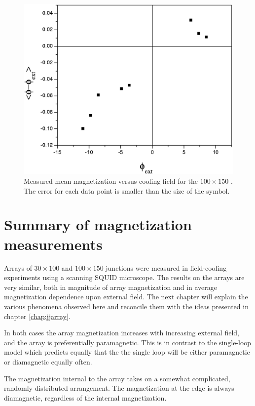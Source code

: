 \begin{figure}[p]
\includegraphics[width=5.7in]{figs/pme_exp/fig3_10.eps}
\caption[Measured mean magnetization versus cooling field for
$100 \times 150$ junction array.]{Measured mean magnetization versus
cooling field for the $100 \times 150$ \jja. The error for each 
data point is smaller than the size of the symbol.}
\label{fig:lg_mag_vs_ext}
\end{figure}

\section{Summary of magnetization measurements}

Arrays of $30 \times 100$ and $100\times 150$ junctions were
measured in field-cooling experiments using a scanning SQUID microscope. 
The results on the arrays are very similar, both in magnitude of 
array magnetization and in average 
magnetization dependence upon external field. 
The next chapter will explain the various phenomena observed
here and reconcile them with the ideas presented in 
chapter \ref{chap:jjarray}. 

In both cases the array magnetization increases with increasing external
field, and the array is preferentially paramagnetic. This is in contrast
to the single-loop model which predicts equally that the the single loop
will be either paramagnetic or diamagnetic equally often.  

The magnetization internal to the array takes on a somewhat complicated,
randomly distributed arrangement. The magnetization
at the edge is always diamagnetic, regardless of the internal magnetization. 

 
